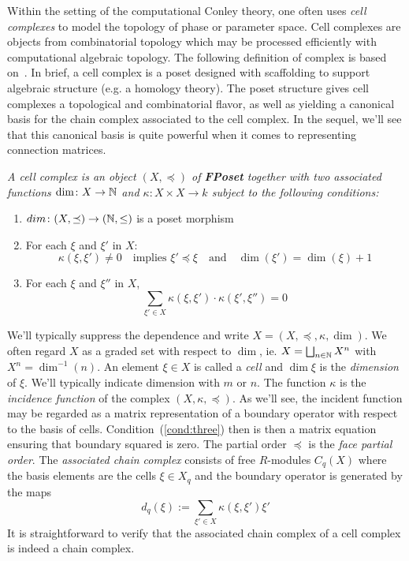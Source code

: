 Within the setting of the computational Conley theory, one often uses {\em cell complexes} to model the topology of phase or parameter space.  Cell complexes are objects from combinatorial topology which may be processed efficiently with computational algebraic topology.  The following definition of complex is based on~\cite[Chapter 3.1]{lefschetz}.   In brief, a cell complex is a poset designed with scaffolding to support algebraic structure (e.g. a homology theory). The poset structure gives cell complexes a topological and combinatorial flavor, as well as yielding a canonical basis for the chain complex associated to the cell complex. In the sequel, we'll see that this canonical basis is quite powerful when it comes to representing connection matrices.

\begin{defn}
{\em
A {\em cell complex} is an object $(X,\preceq)$ of {\bf FPoset} together with two associated functions $\dim\colon X\to {\mathbb{N}}$ and $\kappa\colon X\times X\to k$ subject to the following conditions:
\begin{enumerate}
\item $dim\colon(X,\preceq)\to ({\mathbb{N}},\leq)$ is a poset morphism
\item  For each $\xi$ and $\xi'$ in $X$:
$$\kappa(\xi,\xi')\neq 0\quad\text{implies } \xi'\preceq \xi \quad\text{and}\quad \dim(\xi') = \dim(\xi)+1$$
\item\label{cond:three} For each $\xi$ and $\xi''$ in $X$,
$$\sum_{\xi'\in X} \kappa(\xi,\xi')\cdot \kappa(\xi',\xi'')=0$$
\end{enumerate}
}
\end{defn}

We'll typically suppress the dependence and write $X=(X,\preceq,\kappa,\dim)$.  We often regard $X$ as a graded set with respect to $\dim$, ie. $X = \bigsqcup_{n\in {\mathbb{N}}} X^n$ with $X^n = \dim^{-1}(n)$.  An element $\xi\in X$ is called a {\em cell} and $\dim \xi$ is the {\em dimension} of $\xi$. We'll typically indicate dimension with $m$ or $n$. The function $\kappa$ is the {\em incidence function} of the complex $(X,\kappa,\preceq)$.   As we'll see, the incident function may be regarded as a matrix representation of a boundary operator with respect to the basis of cells.  Condition~(\ref{cond:three}) then is then a matrix equation ensuring that boundary squared is zero.   The partial order $\preceq$ is the {\em face partial order}. The {\em associated chain complex} consists of free $R$-modules $C_q(X)$ where the basis elements are the cells $\xi \in X_q$ and the boundary operator is generated by the maps $$d_q( \xi) := \sum_{\xi' \in X} \kappa(\xi, \xi')\xi'$$ It is straightforward to verify that the associated chain complex of a cell complex is indeed a chain complex.






